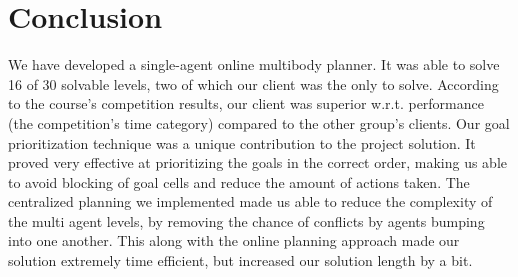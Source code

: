 \section{Conclusion}
\label{sec:conclusion}

We have developed a single-agent online multibody planner.
It was able to solve 16 of 30 solvable levels, two of which our client was the only to solve.
According to the course's competition results, our client was superior w.r.t. performance (the competition's time category) compared to the other group's clients.
Our goal prioritization technique was a unique contribution to the project solution. 
It proved very effective at prioritizing the goals in the correct order, making us able to avoid blocking of goal cells and reduce the amount of actions taken.
The centralized planning we implemented made us able to reduce the complexity of the multi agent levels, by removing the chance of conflicts by agents bumping into one another.
This along with the online planning approach made our solution extremely time efficient, but increased our solution length by a bit.


